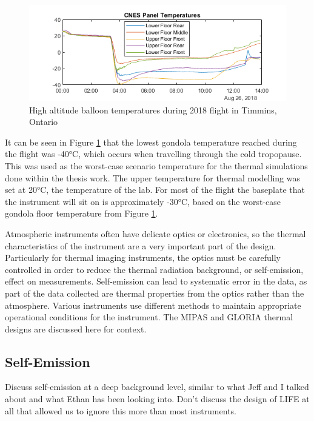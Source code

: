  \begin{figure}[h]
\centering
  \includegraphics{chap2_images/CNES_temps_CATS_2018.png}
  \caption{High altitude balloon temperatures during 2018 flight in Timmins, Ontario}
  \label{fig:2018_timmins_temps}
\end{figure}

It can be seen in Figure \ref{fig:2018_timmins_temps} that the lowest gondola temperature reached during the flight was -40°C, which occurs when travelling through the cold tropopause. This was used as the worst-case scenario temperature for the thermal simulations done within the thesis work. The upper temperature for thermal modelling was set at 20°C, the temperature of the lab. For most of the flight the baseplate that the instrument will sit on is approximately -30°C, based on the worst-case gondola floor temperature from Figure \ref{fig:2018_timmins_temps}. 

Atmospheric instruments often have delicate optics or electronics, so the thermal characteristics of the instrument are a very important part of the design. Particularly for thermal imaging instruments, the optics must be carefully controlled in order to reduce the thermal radiation background, or self-emission, effect on measurements. Self-emission can lead to systematic error in the data, as part of the data collected are thermal properties from the optics rather than the atmosphere. Various instruments use different methods to maintain appropriate operational conditions for the instrument. The MIPAS and GLORIA thermal designs are discussed here for context. 

\subsection{Self-Emission}
Discuss self-emission at a deep background level, similar to what Jeff and I talked about and what Ethan has been looking into. Don't discuss the design of LIFE at all that allowed us to ignore this more than most instruments.

